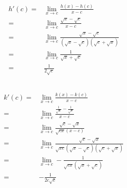 \documentclass{article}
\begin{document}
            \paragraph{
                \begin{equation*}
                    \begin{split}
                        h'(c)=&\lim _{x\rightarrow c} \frac{h(x)-h(c)}{x-c}\\
                            =&\lim_{x\rightarrow c}\frac{\sqrt{x}-\sqrt{c}}{x-c}\\
                            =&\lim_{x\rightarrow c}\frac{\sqrt{x}-\sqrt{c}}{(\sqrt{x}-\sqrt{c})(\sqrt{c}+\sqrt{x})}\\
                            =&\lim_{x\rightarrow c}\frac{1}{\sqrt{x}+\sqrt{c}}\\
                            =&\frac{1}{2\sqrt{c}}
                    \end{split}
                \end{equation*}
            }
        \subsection{}
            \paragraph{
                \begin{equation*}
                    \begin{split}
                        k'(c)=&\lim_{x\rightarrow c}\frac{k(x)-k(c)}{x-c}\\
                            =&\lim_{x\rightarrow c}\frac{\frac{1}{\sqrt{x}}-\frac{1}{\sqrt{c}}}{x-c}\\
                            =&\lim_{x\rightarrow c} \frac{\sqrt{c}-\sqrt{x}}{\sqrt{cx}(x-c)}\\
                            =&\lim_{x\rightarrow c}\frac{\sqrt{c}-\sqrt{x}}{\sqrt{xc}(\sqrt{x}-\sqrt{c})(\sqrt{c}+\sqrt{x})}\\
                            =&\lim_{x\rightarrow c}-\frac{1}{\sqrt{cx}(\sqrt{x}+\sqrt{c})}\\
                            =&-\frac{1}{2c\sqrt{c}}
                    \end{split}
                \end{equation*}
            }
\end{document}

